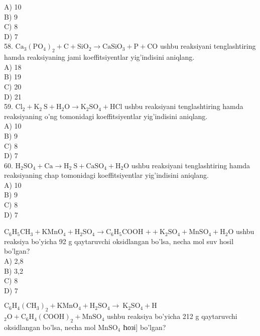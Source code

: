 A) 10\\
B) 9\\
C) 8\\
D) 7\\
58. $\mathrm{Ca}_{3}\left(\mathrm{PO}_{4}\right)_{2}+\mathrm{C}+\mathrm{SiO}_{2} \rightarrow \mathrm{CaSiO}_{3}+\mathrm{P}+\mathrm{CO}$ ushbu reaksiyani tenglashtiring hamda reaksiyaning jami koeffitsiyentlar yig'indisini aniqlang.\\
A) 18\\
B) 19\\
C) 20\\
D) 21\\
59. $\mathrm{Cl}_{2}+\mathrm{K}_{2} \mathrm{~S}+\mathrm{H}_{2} \mathrm{O} \rightarrow \mathrm{K}_{2} \mathrm{SO}_{4}+\mathrm{HCl}$ ushbu reaksiyani tenglashtiring hamda reaksiyaning o'ng tomonidagi koeffitsiyentlar yig'indisini aniqlang.\\
A) 10\\
B) 9\\
C) 8\\
D) 7\\
60. $\mathrm{H}_{2} \mathrm{SO}_{4}+\mathrm{Ca} \rightarrow \mathrm{H}_{2} \mathrm{~S}+\mathrm{CaSO}_{4}+\mathrm{H}_{2} \mathrm{O}$ ushbu reaksiyani tenglashtiring hamda reaksiyaning chap tomonidagi koeffitsiyentlar yig'indisini aniqlang.\\
A) 10\\
B) 9\\
C) 8\\
D) 7
  \item $\mathrm{C}_{6} \mathrm{H}_{5} \mathrm{CH}_{3}+\mathrm{KMnO}_{4}+\mathrm{H}_{2} \mathrm{SO}_{4} \rightarrow \mathrm{C}_{6} \mathrm{H}_{5} \mathrm{COOH}$ $++\mathrm{K}_{2} \mathrm{SO}_{4}+\mathrm{MnSO}_{4}+\mathrm{H}_{2} \mathrm{O}$ ushbu reaksiya bo'yicha 92 g qaytaruvchi oksidlangan bo'lsa, necha mol suv hosil bo'lgan?\\
A) 2,8\\
B) 3,2\\
C) 8\\
D) 7
  \item $\mathrm{C}_{6} \mathrm{H}_{4}\left(\mathrm{CH}_{3}\right)_{2}+\mathrm{KMnO}_{4}+\mathrm{H}_{2} \mathrm{SO}_{4} \rightarrow \mathrm{~K}_{2} \mathrm{SO}_{4}+\mathrm{H}$ ${ }_{2} \mathrm{O}+\mathrm{C}_{6} \mathrm{H}_{4}(\mathrm{COOH})_{2}+\mathrm{MnSO}_{4}$ ushbu reaksiya bo'yicha 212 g qaytaruvchi\\
oksidlangan bo'lsa, necha mol $\mathrm{MnSO}_{4}$ Һозі] bo'lgan?\\
